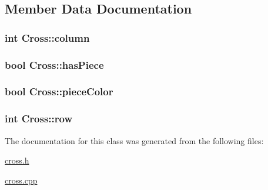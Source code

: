 \subsection{Member Data Documentation}
\subsubsection[{\texorpdfstring{column}{column}}]{\setlength{\rightskip}{0pt plus 5cm}int Cross\+::column\hspace{0.3cm}{\ttfamily [private]}}\hypertarget{classCross_a618536d0ef3121b0e2a8d74737e1a00c}{}\label{classCross_a618536d0ef3121b0e2a8d74737e1a00c}
\subsubsection[{\texorpdfstring{has\+Piece}{hasPiece}}]{\setlength{\rightskip}{0pt plus 5cm}bool Cross\+::has\+Piece\hspace{0.3cm}{\ttfamily [private]}}\hypertarget{classCross_aa8369e751da4a7910bb552242ac19092}{}\label{classCross_aa8369e751da4a7910bb552242ac19092}
\subsubsection[{\texorpdfstring{piece\+Color}{pieceColor}}]{\setlength{\rightskip}{0pt plus 5cm}bool Cross\+::piece\+Color\hspace{0.3cm}{\ttfamily [private]}}\hypertarget{classCross_a7ed2b797ef98393f7096acda24e7e38f}{}\label{classCross_a7ed2b797ef98393f7096acda24e7e38f}
\subsubsection[{\texorpdfstring{row}{row}}]{\setlength{\rightskip}{0pt plus 5cm}int Cross\+::row\hspace{0.3cm}{\ttfamily [private]}}\hypertarget{classCross_a21935454e9ea07a0f2ec0bfe9338622c}{}\label{classCross_a21935454e9ea07a0f2ec0bfe9338622c}


The documentation for this class was generated from the following files\+:\begin{DoxyCompactItemize}
\item 
\hyperlink{cross_8h}{cross.\+h}\item 
\hyperlink{cross_8cpp}{cross.\+cpp}\end{DoxyCompactItemize}
